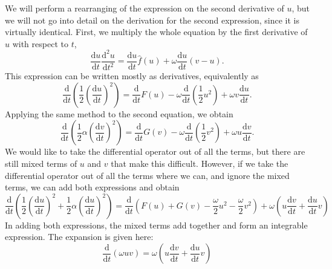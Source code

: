 \documentclass{article}
\begin{document}
We will perform a rearranging of the expression on the second derivative of $u$,
but we will not go into detail on the derivation for the second expression,
since it is virtually identical.
First, we multiply the whole equation by the first derivative of $u$ with respect to $t$,
\begin{equation*}
    \frac{\mathrm{d}u}{\mathrm{d}t}\frac{\mathrm{d}^2 u}{\mathrm{d}t^2} = \frac{\mathrm{d}u}{\mathrm{d}t}\hat{f}(u) + \omega \frac{\mathrm{d}u}{\mathrm{d}t}(v-u).
\end{equation*}
This expression can be written mostly as derivatives, equivalently as
\begin{equation*}
    \frac{\mathrm{d}}{\mathrm{d}t}\left(
        \frac{1}{2}\left(\frac{\mathrm{d}u}{\mathrm{d}t}\right)^2
     \right) = \frac{\mathrm{d}}{\mathrm{d}t}F(u) - \omega\frac{\mathrm{d}}{\mathrm{d}t}\left(\frac{1}{2}u^2\right) + \omega v \frac{\mathrm{d}u}{\mathrm{d}t}.
\end{equation*}
Applying the same method to the second equation, we obtain
\begin{equation*}
    \frac{\mathrm{d}}{\mathrm{d}t}\left(
        \frac{1}{2}\alpha\left(\frac{\mathrm{d}v}{\mathrm{d}t}\right)^2
    \right) = \frac{\mathrm{d}}{\mathrm{d}t}G(v) - \omega\frac{\mathrm{d}}{\mathrm{d}t}\left( \frac{1}{2}v^2 \right) + \omega u \frac{\mathrm{d}v}{\mathrm{d}t}.
\end{equation*}
We would like to take the differential operator out of all the terms, but there are still mixed terms of $u$ and $v$ that make this difficult.
However, if we take the differential operator out of all the terms where we can, and ignore the mixed terms, we can add both expressions and obtain
\begin{equation*}
    \frac{\mathrm{d}}{\mathrm{d}t}\left(
        \frac{1}{2}\left(\frac{\mathrm{d}u}{\mathrm{d}t}\right)^2 + \frac{1}{2}\alpha\left(\frac{\mathrm{d}u}{\mathrm{d}t}\right)^2
    \right) = \frac{\mathrm{d}}{\mathrm{d}t}\left(
        F(u) + G(v) - \frac{\omega}{2}u^2 -\frac{\omega}{2}v^2
    \right) + \omega \left(
        u \frac{\mathrm{d}v}{\mathrm{d}t} + \frac{\mathrm{d}u}{\mathrm{d}t}v
    \right)
\end{equation*}
In adding both expressions, the mixed terms add together and form an integrable expression.
The expansion is given here:
\begin{equation*}
    \frac{\mathrm{d}}{\mathrm{d}t}(\omega uv) = \omega \left( u \frac{\mathrm{d}v}{\mathrm{d}t} + \frac{\mathrm{d}u}{\mathrm{d}t} v \right)
\end{equation*}
\end{document}
